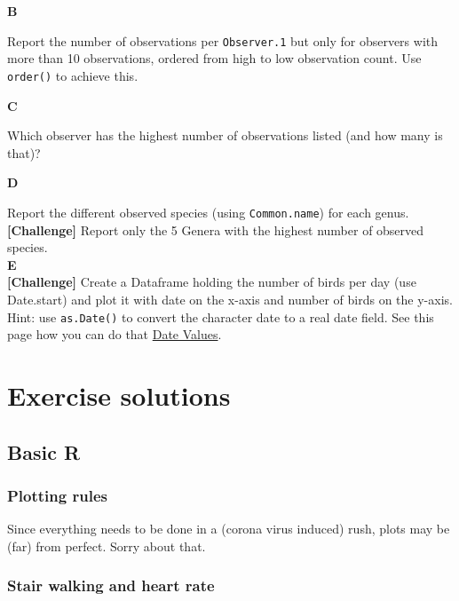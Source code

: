 \documentclass[]{book}
\begin{document}
\textbf{B}

Report the number of observations per \texttt{Observer.1} but only for observers with more than 10 observations, ordered from high to low observation count. Use \texttt{order()} to achieve this.

\textbf{C}

Which observer has the highest number of observations listed (and how many is that)?

\textbf{D}

Report the different observed species (using \texttt{Common.name}) for each genus. \textbf{{[}Challenge{]}} Report only the 5 Genera with the highest number of observed species.\\
\textbf{E}\\
\textbf{{[}Challenge{]}} Create a Dataframe holding the number of birds per day (use Date.start) and plot it with date on the x-axis and number of birds on the y-axis. Hint: use \texttt{as.Date()} to convert the character date to a real date field. See this page how you can do that \href{http://www.statmethods.net/input/dates.html}{Date Values}.

\hypertarget{exercise-solutions}{%
\chapter{Exercise solutions}\label{exercise-solutions}}

\hypertarget{basic-r-2}{%
\section{Basic R}\label{basic-r-2}}

\hypertarget{plotting-rules-1}{%
\subsection*{Plotting rules}\label{plotting-rules-1}}

Since everything needs to be done in a (corona virus induced) rush, plots may be (far) from perfect. Sorry about that.

\hypertarget{stair-walking-and-heart-rate-1}{%
\subsection{Stair walking and heart rate}\label{stair-walking-and-heart-rate-1}}
\end{document}
